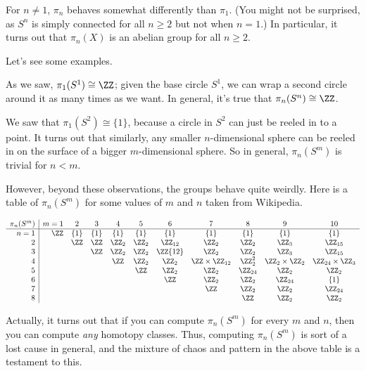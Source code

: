 For $n \neq 1$, $\pi_n$ behaves somewhat differently than $\pi_1$.
(You might not be surprised, as $S^n$ is simply connected for all $n \ge 2$ but not when $n=1$.)
In particular, it turns out that $\pi_n(X)$ is an abelian group for all $n \ge 2$.

Let's see some examples.
\begin{example}
	As we saw, $\pi_1(S^1) \cong \ZZ$; given the base circle $S^1$,
	we can wrap a second circle around it as many times as we want.
	In general, it's true that $\pi_n(S^n) \cong \ZZ$.
\end{example}
\begin{example}
	We saw that $\pi_1(S^2) \cong \{1\}$, because 
	a circle in $S^2$ can just be reeled in to a point.
	It turns out that similarly, any smaller $n$-dimensional sphere
	can be reeled in on the surface of a bigger $m$-dimensional sphere.
	So in general, $\pi_n(S^m)$ is trivial for $n < m$.
\end{example}
However, beyond these observations, the groups behave quite weirdly.
Here is a table of $\pi_n(S^m)$ for some values of $m$ and $n$
taken from Wikipedia.

\[
	\begin{array}{r|rccccccccc}
		\pi_n(S^m) & m = 1 & 2 & 3 & 4 & 5 & 6 & 7 & 8 & 9 & 10 \\ \hline
		n = 1 & \ZZ & \{1\} & \{1\} & \{1\} & \{1\} & \{1\} & \{1\} & \{1\} & \{1\} & \{1\} \\
		2 &  & \ZZ & \ZZ & \Zc2 & \Zc2 & \Zc{12} & \Zc2 & \Zc2 & \Zc3 & \Zc{15}\\
		3 &  &  & \ZZ & \Zc2 & \Zc2 & \ZZ{12} & \Zc2 & \Zc2 & \Zc3 & \Zc{15}\\
		4 &  &  &  & \ZZ & \Zc2 & \Zc2 & \ZZ \times \Zc{12} & \Zc2^2 & \Zc2 \times \Zc2 & \Zc{24} \times \Zc3 \\
		5 &  &  &  &  & \ZZ & \Zc2 & \Zc2 & \Zc{24} & \Zc2 & \Zc2 \\
		6 &  &  &  &  &  & \ZZ & \Zc2 & \Zc2 & \Zc{24} & \{1\} \\
		7 &  &  &  &  &  &  & \ZZ & \Zc2 & \Zc2 & \Zc{24} \\
		8 &  &  &  &  &  &  &  & \ZZ & \Zc2 & \Zc2
	\end{array}
\]

Actually, it turns out that if you can compute $\pi_n(S^m)$
for every $m$ and $n$,
then you can compute \emph{any} homotopy classes.
Thus, computing $\pi_n(S^m)$ is sort of a lost cause in general,
and the mixture of chaos and pattern in the above table is a testament to this.


